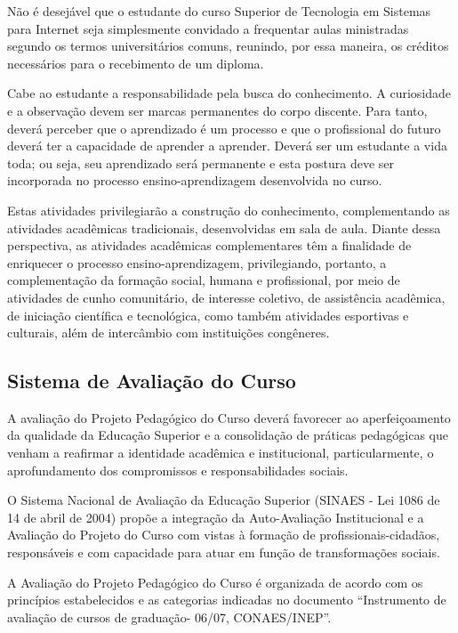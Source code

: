 	Não é desejável que o estudante do curso Superior de Tecnologia em Sistemas para Internet seja simplesmente convidado a frequentar aulas ministradas segundo os termos universitários comuns, reunindo, por essa maneira, os créditos necessários para o recebimento de um diploma.
	
	Cabe ao estudante a responsabilidade pela busca do conhecimento. A curiosidade e a observação devem ser marcas permanentes do corpo discente. Para tanto, deverá perceber que o aprendizado é um processo e que o profissional do futuro deverá ter a capacidade de aprender a aprender. Deverá ser um estudante a vida toda; ou seja, seu aprendizado será permanente e esta postura deve ser incorporada no processo ensino-aprendizagem desenvolvida no curso.
	
Estas atividades privilegiarão a construção do conhecimento, complementando as atividades acadêmicas tradicionais, desenvolvidas em sala de aula. Diante dessa perspectiva, as atividades acadêmicas complementares têm a finalidade de enriquecer o processo ensino-aprendizagem, privilegiando, portanto, a complementação da formação social, humana e profissional, por meio de atividades de cunho comunitário, de interesse coletivo, de assistência acadêmica, de iniciação científica e tecnológica, como também atividades esportivas e culturais, além de intercâmbio com instituições congêneres.

\subsection{Sistema de Avalia\c{c}\~ao do Curso}

A avaliação do Projeto Pedagógico do Curso deverá favorecer ao aperfeiçoamento da qualidade da Educação Superior e a consolidação de práticas pedagógicas que venham a reafirmar a identidade acadêmica e institucional, particularmente, o aprofundamento dos compromissos e responsabilidades sociais.

O Sistema Nacional de Avaliação da Educação Superior (SINAES - Lei 1086 de 14 de abril de 2004) propõe a integração da Auto-Avaliação Institucional e a Avaliação do Projeto do Curso com vistas à formação de profissionais-cidadãos, responsáveis e com capacidade para atuar em função de transformações sociais.

A Avaliação do Projeto Pedagógico do Curso é organizada de acordo com os princípios estabelecidos e as categorias indicadas no documento “Instrumento de avaliação de cursos de graduação- 06/07, CONAES/INEP”.

